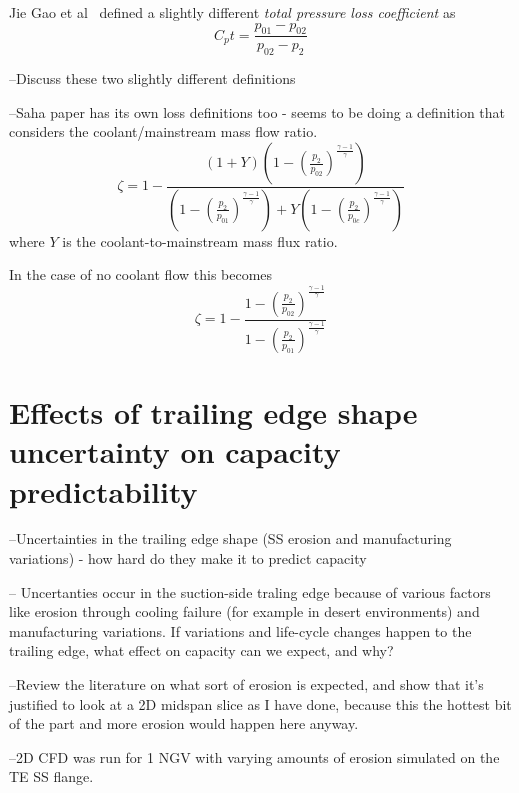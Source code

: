 \documentclass[a4paper, 11pt, twoside]{report}
\begin{document}
Jie Gao et al~\cite{gao_te} defined a slightly different \textit{total pressure loss coefficient} as
\begin{equation}
C_pt = \frac{
p_{01} - p_{02}
}{
p_{02} - p_2
}
\end{equation}

--Discuss these two slightly different definitions


 
--Saha paper has its own loss definitions too - seems to be doing a definition that considers the coolant/mainstream mass flow ratio.
\begin{equation}
\zeta = 
1 -
\frac{ 
	\left( 1 + Y \right) 
	\left(
		1 -
		\left(
			\frac{p_2}{p_{02}}
		\right)
		^\frac{\gamma-1}{\gamma}
	\right)
}{
	\left(
		1 -
		\left(
			\frac{p_2}{p_{01}}
		\right)
		^\frac{\gamma-1}{\gamma}
	\right)
	+Y
	\left(
		1 -
		\left(
			\frac{p_2}{p_{0c}}
		\right)
		^\frac{\gamma-1}{\gamma}
	\right)
}
\end{equation}
where $Y$ is the coolant-to-mainstream mass flux ratio.

In the case of no coolant flow this becomes
\begin{equation}
\zeta = 
1 -
\frac{ 
		1 -
		\left(
			\frac{p_2}{p_{02}}
		\right)
		^\frac{\gamma-1}{\gamma}
}{
		1 -
		\left(
			\frac{p_2}{p_{01}}
		\right)
		^\frac{\gamma-1}{\gamma}
}
\end{equation}

\section{Effects of trailing edge shape uncertainty on capacity predictability}

--Uncertainties in the trailing edge shape (SS erosion and manufacturing variations) - how hard do they make it to predict capacity

-- Uncertanties occur in the suction-side traling edge because of various factors like erosion through cooling failure (for example in desert environments) and manufacturing variations. If variations and life-cycle changes happen to the trailing edge, what effect on capacity can we expect, and why?

--Review the literature on what sort of erosion is expected, and show that it’s justified to look at a 2D midspan slice as I have done, because this the hottest bit of the part and more erosion would happen here anyway.

--2D CFD was run for 1 NGV with varying amounts of erosion simulated on the TE SS flange.
\end{document}
